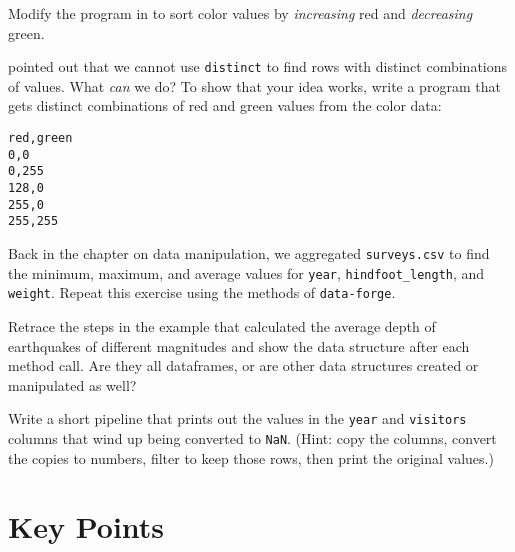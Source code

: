 
Modify the program in  to sort color values
by \emph{increasing} red and \emph{decreasing} green.


 pointed out that we cannot use \texttt{distinct}
to find rows with distinct combinations of values.
What \emph{can} we do?
To show that your idea works,
write a program that gets distinct combinations of red and green values from the color data:

\begin{verbatim}
red,green
0,0
0,255
128,0
255,0
255,255
\end{verbatim}


Back in the chapter on data manipulation,
we aggregated \texttt{surveys.csv} to find the minimum, maximum, and average values 
for \texttt{year}, \texttt{hindfoot\_length}, and \texttt{weight}.
Repeat this exercise using the methods of \texttt{data-forge}.


Retrace the steps in the example that calculated
the average depth of earthquakes of different magnitudes
and show the data structure after each method call.
Are they all dataframes,
or are other data structures created or manipulated as well?


Write a short pipeline that prints out the values in the \texttt{year} and \texttt{visitors} columns
that wind up being converted to \texttt{NaN}.
(Hint: copy the columns, convert the copies to numbers, filter to keep those rows, then print the original values.)

\section*{Key Points}


